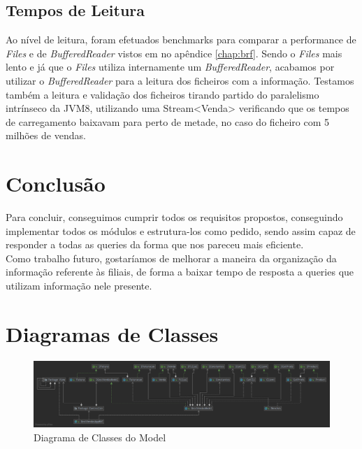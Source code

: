 \documentclass[a4paper]{report}
\begin{document}
\section{Tempos de Leitura}
Ao nível de leitura, foram efetuados benchmarks para comparar a performance de
\textit{Files} e de \textit{BufferedReader} vistos em no apêndice \ref{chap:brf}. Sendo o
\textit{Files} mais lento e já que o \textit{Files} utiliza internamente um
\textit{BufferedReader}, acabamos por utilizar o \textit{BufferedReader} para a leitura
dos ficheiros com a informação. Testamos também a leitura e validação dos ficheiros
tirando partido do paralelismo intrínseco da JVM8, utilizando uma Stream<Venda>
verificando que os tempos de carregamento baixavam para perto de metade, no caso do
ficheiro com 5 milhões de vendas.

\chapter{Conclusão}

Para concluir, conseguimos cumprir todos os requisitos propostos, conseguindo implementar
todos os módulos e estrutura-los como pedido, sendo assim capaz de responder a todas as 
queries da forma que nos pareceu mais eficiente.\\
Como trabalho futuro, gostaríamos de melhorar a maneira da organização da informação 
referente às filiais, de forma a baixar tempo de resposta a queries que utilizam informação
nele presente.

\appendix

\chapter{Diagramas de Classes}
\begin{figure}[H]
    \begin{center}
        \includegraphics[width=1\textwidth]{modelGraph.png}\par
        \caption{Diagrama de Classes do Model}
    \end{center}
\end{figure}
\end{document}
